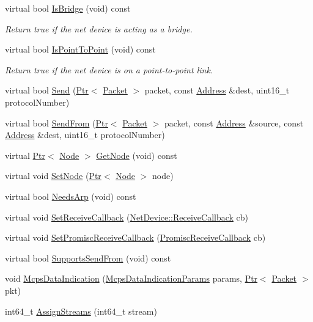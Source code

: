 \begin{DoxyCompactItemize}
virtual bool \hyperlink{classns3_1_1LrWpanNetDevice_a87a083ab71f5734da0138c5f3ba5c3b8}{Is\+Bridge} (void) const 
\begin{DoxyCompactList}\small\item\em Return true if the net device is acting as a bridge. \end{DoxyCompactList}\item 
virtual bool \hyperlink{classns3_1_1LrWpanNetDevice_a6da5bfdf66df0022d47689a1b86db9b6}{Is\+Point\+To\+Point} (void) const 
\begin{DoxyCompactList}\small\item\em Return true if the net device is on a point-\/to-\/point link. \end{DoxyCompactList}\item 
virtual bool \hyperlink{classns3_1_1LrWpanNetDevice_a76722847d2ca57ded0e97e1256fe0356}{Send} (\hyperlink{classns3_1_1Ptr}{Ptr}$<$ \hyperlink{classns3_1_1Packet}{Packet} $>$ packet, const \hyperlink{classns3_1_1Address}{Address} \&dest, uint16\+\_\+t protocol\+Number)
\item 
virtual bool \hyperlink{classns3_1_1LrWpanNetDevice_afdce02729e769d26895c56c7189fa12e}{Send\+From} (\hyperlink{classns3_1_1Ptr}{Ptr}$<$ \hyperlink{classns3_1_1Packet}{Packet} $>$ packet, const \hyperlink{classns3_1_1Address}{Address} \&source, const \hyperlink{classns3_1_1Address}{Address} \&dest, uint16\+\_\+t protocol\+Number)
\item 
virtual \hyperlink{classns3_1_1Ptr}{Ptr}$<$ \hyperlink{classns3_1_1Node}{Node} $>$ \hyperlink{classns3_1_1LrWpanNetDevice_a8e4baafada95ad1f165960a3f111d96b}{Get\+Node} (void) const 
\item 
virtual void \hyperlink{classns3_1_1LrWpanNetDevice_a1eaad99ee6281913a727ba92b2b1cc2d}{Set\+Node} (\hyperlink{classns3_1_1Ptr}{Ptr}$<$ \hyperlink{classns3_1_1Node}{Node} $>$ node)
\item 
virtual bool \hyperlink{classns3_1_1LrWpanNetDevice_a60d99de9132c1b7ea11eaccd4ead68b1}{Needs\+Arp} (void) const 
\item 
virtual void \hyperlink{classns3_1_1LrWpanNetDevice_ae8cf332e8b98ef68657ab20e71437d43}{Set\+Receive\+Callback} (\hyperlink{classns3_1_1NetDevice_ad5e5e1ca187472bc2ba99575d8def568}{Net\+Device\+::\+Receive\+Callback} cb)
\item 
virtual void \hyperlink{classns3_1_1LrWpanNetDevice_a3ae6b60dc568a5a876c2f78d8b3f50a8}{Set\+Promisc\+Receive\+Callback} (\hyperlink{classns3_1_1NetDevice_a427225795919f26c414bee2ea3f31ed2}{Promisc\+Receive\+Callback} cb)
\item 
virtual bool \hyperlink{classns3_1_1LrWpanNetDevice_a0738cf8c7b705409f7a82effa0bc58c2}{Supports\+Send\+From} (void) const 
\item 
void \hyperlink{classns3_1_1LrWpanNetDevice_a620a7403f05c4dc25de92c7304e4f17d}{Mcps\+Data\+Indication} (\hyperlink{structns3_1_1McpsDataIndicationParams}{Mcps\+Data\+Indication\+Params} params, \hyperlink{classns3_1_1Ptr}{Ptr}$<$ \hyperlink{classns3_1_1Packet}{Packet} $>$ pkt)
\item 
int64\+\_\+t \hyperlink{classns3_1_1LrWpanNetDevice_a54b3d2e9209b0b6adea253236836166b}{Assign\+Streams} (int64\+\_\+t stream)
\end{DoxyCompactItemize}

